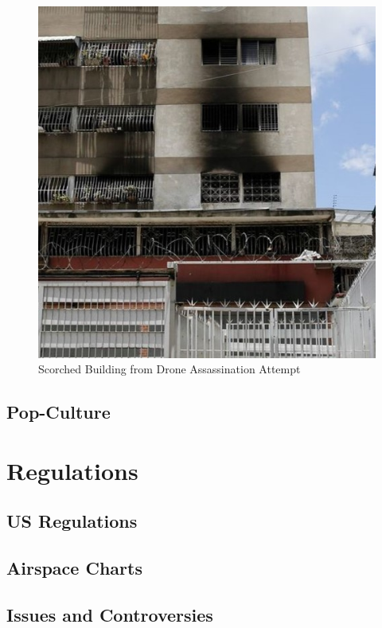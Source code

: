\documentclass[
]{book}
\theoremstyle{definition}
\theoremstyle{definition}
\theoremstyle{definition}
\theoremstyle{definition}
\theoremstyle{remark}
\begin{document}
\begin{figure}

{\centering \includegraphics[width=0.8\linewidth]{images/history/Venezuela2} 

}

\caption{Scorched Building from Drone Assassination Attempt}\label{fig:venAssassin2}
\end{figure}

\hypertarget{pop-culture}{%
\section{Pop-Culture}\label{pop-culture}}

\hypertarget{regulations}{%
\chapter{Regulations}\label{regulations}}

\hypertarget{us-regulations}{%
\section{US Regulations}\label{us-regulations}}

\hypertarget{airspace-charts}{%
\section{Airspace Charts}\label{airspace-charts}}

\hypertarget{issues-and-controversies}{%
\section{Issues and Controversies}\label{issues-and-controversies}}
\end{document}
